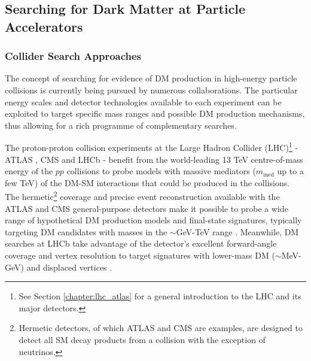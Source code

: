 \subsection{Searching for Dark Matter at Particle Accelerators}

\subsubsection{Collider Search Approaches}

The concept of searching for evidence of DM production in high-energy particle collisions is currently being pursued by numerous collaborations. The particular energy scales and detector technologies available to each experiment can be exploited to target specific mass ranges and possible DM production mechanisms, thus allowing for a rich programme of complementary searches.

The proton-proton collision experiments at the Large Hadron Collider (LHC)\footnote{See Section \ref{chapter:lhc_atlas} for a general introduction to the LHC and its major detectors.} \cite{lhc_machine} - ATLAS \cite{atlas}, CMS \cite{cms} and LHCb \cite{LHCb} - benefit from the world-leading 13 TeV centre-of-mass energy of the \(pp\) collisions to probe models with massive mediators (\(m_\text{med}\) up to a few TeV) of the DM-SM interactions that could be produced in the collisions. The hermetic\footnote{Hermetic detectors, of which ATLAS and CMS are examples, are designed to detect all SM decay products from a collision with the exception of neutrinos.} coverage and precise event reconstruction available with the ATLAS and CMS general-purpose detectors make it possible to probe a wide range of hypothetical DM production models and final-state signatures, typically targeting DM candidates with masses in the \(\sim\)GeV-TeV range \cite{Trevisani:2018psx}. Meanwhile, DM searches at LHCb take advantage of the detector's excellent forward-angle coverage and vertex resolution to target signatures with lower-mass DM (\(\sim\)MeV-GeV) and displaced vertices \cite{mombacher2021dark}.

